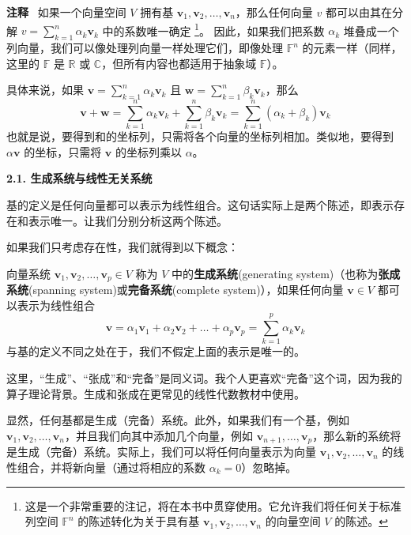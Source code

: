 \textbf{注释}~
如果一个向量空间 $V$ 拥有基 $\mathbf{v}_1, \mathbf{v}_2, \dots, \mathbf{v}_n$，那么任何向量 $v$ 都可以由其在分解 $v = \sum_{k=1}^n \alpha_k \mathbf{v}_k$ 中的系数唯一确定
\footnote{这是一个非常重要的注记，将在本书中贯穿使用。它允许我们将任何关于标准列空间 $\mathbb{F}^n$ 的陈述转化为关于具有基 $\mathbf{v}_1, \mathbf{v}_2, \dots, \mathbf{v}_n$ 的向量空间 $V$ 的陈述。}。
因此，如果我们把系数 $\alpha_k$ 堆叠成一个列向量，我们可以像处理列向量一样处理它们，即像处理 $\mathbb{F}^n$ 的元素一样（同样，这里的 $\mathbb{F}$ 是 $\mathbb{R}$ 或 $\mathbb{C}$，但所有内容也都适用于抽象域 $\mathbb{F}$）。

具体来说，如果 $\mathbf{v} = \sum_{k=1}^n \alpha_k \mathbf{v}_k$ 且 $\mathbf{w} = \sum_{k=1}^n \beta_k \mathbf{v}_k$，那么
$$ \mathbf{v} + \mathbf{w} = \sum_{k=1}^n \alpha_k \mathbf{v}_k + \sum_{k=1}^n \beta_k \mathbf{v}_k = \sum_{k=1}^n (\alpha_k + \beta_k) \mathbf{v}_k $$
也就是说，要得到和的坐标列，只需将各个向量的坐标列相加。类似地，要得到 $\alpha \mathbf{v}$ 的坐标，只需将 $\mathbf{v}$ 的坐标列乘以 $\alpha$。



\textbf{2.1. 生成系统与线性无关系统}

基的定义是任何向量都可以表示为线性组合。这句话实际上是两个陈述，即表示存在和表示唯一。让我们分别分析这两个陈述。

如果我们只考虑存在性，我们就得到以下概念：

\begin{definition} 向量系统 $\mathbf{v}_1, \mathbf{v}_2, \dots, \mathbf{v}_p \in V$ 称为 $V$ 中的\textbf{生成系统}(generating system)（也称为\textbf{张成系统}(spanning system)或\textbf{完备系统}(complete system)），如果任何向量 $\mathbf{v} \in V$ 都可以表示为线性组合
$$
\mathbf{v} = \alpha_1 \mathbf{v}_1 + \alpha_2 \mathbf{v}_2 + \dots + \alpha_p \mathbf{v}_p = \sum_{k=1}^p \alpha_k \mathbf{v}_k
$$
与基的定义不同之处在于，我们不假定上面的表示是唯一的。
\end{definition}

这里，“生成”、“张成”和“完备”是同义词。我个人更喜欢“完备”这个词，因为我的算子理论背景。生成和张成在更常见的线性代数教材中使用。

显然，任何基都是生成（完备）系统。此外，如果我们有一个基，例如 $\mathbf{v}_1, \mathbf{v}_2, \dots, \mathbf{v}_n$，并且我们向其中添加几个向量，例如 $\mathbf{v}_{n+1}, \dots, \mathbf{v}_p$，那么新的系统将是生成（完备）系统。实际上，我们可以将任何向量表示为向量 $\mathbf{v}_1, \mathbf{v}_2, \dots, \mathbf{v}_n$ 的线性组合，并将新向量（通过将相应的系数 $\alpha_k = 0$）忽略掉。

